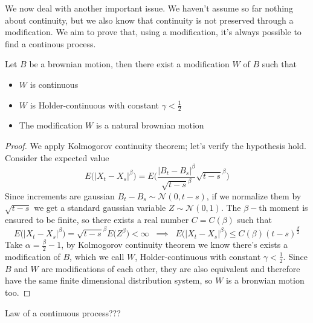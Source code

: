 We now deal with another important issue. We haven't assume so far nothing about continuity, but we also know that continuity is not preserved through a modification. We aim to prove that, using a modification, it's always possible to find a continous process. 

\begin{theorem}
    Let $B$ be a brownian motion, then there exist a modification $W$ of $B$ such that
    \begin{itemize}
        \item $W$ is continuous
        \item $W$ is Holder-continuous with constant $\gamma < \frac{1}{2}$
        \item The modification $W$ is a natural brownian motion
    \end{itemize}
\end{theorem}
\begin{proof}
    We apply Kolmogorov continuity theorem; let's verify the hypothesis hold. Consider the expected value
    \begin{equation*}
        E\Big( \vert X_t - X_s \vert^{\beta} \Big) = E \Bigg( \frac{\vert B_t - B_s \vert^{\beta}}{\sqrt{t-s}^{\beta}} \sqrt{t-s}^{\beta} \Bigg)  
    \end{equation*}
    Since increments are gaussian $B_t - B_s \sim \mathcal{N}(0,t-s)$, if we normalize them by $\sqrt{t-s}$ we get a standard gaussian variable $Z \sim \mathcal{N}(0,1)$.  The $\beta-$th moment is ensured to be finite, so there exists a real number $C = C(\beta)$ such that
    \begin{equation*}
        E\Big( \vert X_t - X_s \vert^{\beta} \Big) = \sqrt{t-s}^{\beta} E\big(Z^{\beta}\big) < \infty \;\; \implies \;\; E\Big( \vert X_t - X_s \vert^{\beta} \Big) \leq C(\beta) (t-s)^{\frac{\beta}{2}}
    \end{equation*}
    Take $\alpha = \frac{\beta}{2}-1$, by Kolmogorov continuity theorem we know there's exists a modification of $B$, which we call $W$, Holder-continuous with constant $\gamma < \frac{1}{2}$. Since $B$ and $W$ are modifications of each other, they are also equivalent and therefore have the same finite dimensional distribution system, so $W$ is a bronwian motion too.  
\end{proof}

Law of a continuous process???


